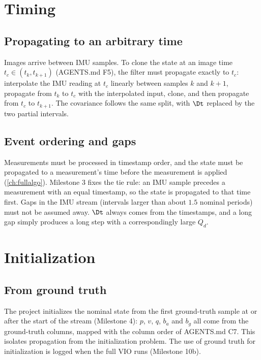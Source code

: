 \section{Timing}

\subsection{Propagating to an arbitrary time}

Images arrive between IMU samples. To clone the state at an image time $t_c \in (t_k, t_{k+1})$ (AGENTS.md F5), the
filter must propagate exactly to $t_c$: interpolate the IMU reading at $t_c$ linearly between samples $k$ and
$k+1$, propagate from $t_k$ to $t_c$ with the interpolated input, clone, and then propagate from $t_c$ to $t_{k+1}$.
The covariance follows the same split, with $\Dt$ replaced by the two partial intervals.

\subsection{Event ordering and gaps}

Measurements must be processed in timestamp order, and the state must be propagated to a measurement's time
before the measurement is applied (\cref{ch:fullalgo}). Milestone 3 fixes the tie rule: an IMU sample precedes a
measurement with an equal timestamp, so the state is propagated to that time first. Gaps in the IMU stream
(intervals larger than about $1.5$ nominal periods) must not be assumed away. $\Dt$ always comes from the
timestamps, and a long gap simply produces a long step with a correspondingly large $Q_d$.

\section{Initialization}

\subsection{From ground truth}

The project initializes the nominal state from the first ground-truth sample at or after the start of the
stream (Milestone 4): $p$, $v$, $q$, $b_a$ and $b_g$ all come from the ground-truth columns, mapped with the
column order of AGENTS.md C7. This isolates propagation from the initialization problem. The use of ground
truth for initialization is logged when the full VIO runs (Milestone 10b).


